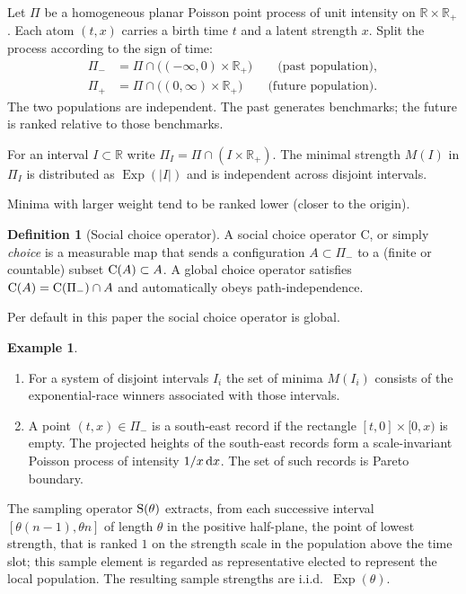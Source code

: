 \documentclass[11pt]{article}
\newcommand{\RR}{\mathbb{R}}
\DeclareMathOperator{\Exp}{Exp}
\theoremstyle{plain}
\theoremstyle{definition}
\newtheorem{definition}[theorem]{Definition}
\newtheorem{example}[theorem]{Example}
\begin{document}
Let \(\Pi\) be a homogeneous planar Poisson point process of unit intensity on \(\RR\times\RR_+\). Each atom \((t,x)\) carries a birth time \(t\) and a latent strength \(x\). Split the process according to the sign of time:
\begin{align*}
\Pi_- &= \Pi\cap\bigl((-\infty,0)\times\RR_+\bigr)\qquad\text{(past population)},\\
\Pi_+ &= \Pi\cap\bigl((0,\infty)\times\RR_+\bigr)\qquad\text{(future population)}.
\end{align*}
The two populations are independent. The past generates benchmarks; the future is ranked relative to those benchmarks.
 
For an interval \(I\subset\RR\) write \(\Pi_I=\Pi\cap(I\times\RR_+)\). The minimal strength \(M(I)\) in \(\Pi_I\) is distributed as \(\Exp(|I|)\) and is independent across disjoint intervals.
 
Minima with larger weight tend to be ranked lower (closer to the origin).
 
\begin{definition}[Social choice operator]
\label{def:choice}
A social choice operator {\rm C}, or simply {\it choice} is a measurable map that sends a configuration \(A\subset\Pi_-\) to a (finite or countable) subset \({\rm C}(A)\subset A\). A global choice operator satisfies \({\rm C}(A)={\rm C}(\Pi_-)\cap A\) and automatically obeys path-independence.
\end{definition}
Per default in this paper the social choice operator is global.
 
 
 
\begin{example}
\begin{enumerate}[label=(\roman*)]
\item For a system of disjoint intervals \(I_i\) the set of minima \(M(I_i)\) consists of the exponential-race winners associated with those intervals.
\item A point \((t,x)\in\Pi_-\) is a south-east record if the rectangle \([t,0]\times[0,x)\) is empty. The projected heights of the south-east records form a scale-invariant Poisson process of intensity \(1/x\,{\rm d}x\). The set of such records is Pareto boundary.
\end{enumerate}
\end{example}
The sampling operator \({\rm S}(\theta)\) extracts, from each successive interval $[\theta(n-1),\theta n]$ of length \(\theta\) in the positive half-plane, the point of lowest strength,
that is ranked $1$ on the strength scale in the population above the time slot; this sample element is regarded as representative elected to represent the local population.
The resulting sample strengths are i.i.d.\ \(\Exp(\theta)\).
 
\end{document}
